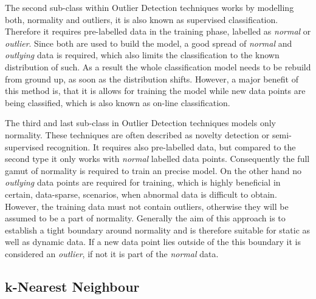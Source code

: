 The second sub-class within Outlier Detection techniques works by modelling both, normality and outliers, it is also known as supervised classification.
Therefore it requires pre-labelled data in the training phase, labelled as \emph{normal} or \emph{outlier}. Since both are used to build the model, a good spread of \emph{normal} and \emph{outlying} data is required, which also limits the classification to the known distribution of such.
As a result the whole classification model needs to be rebuild from ground up, as soon as the distribution shifts.
However, a major benefit of this method is, that it is allows for training the model while new data points are being classified, which is also known as on-line classification. \parencite[cf.][]{Hodge2004}

The third and last sub-class in Outlier Detection techniques models only normality. These techniques are often described as novelty detection or semi-supervised recognition.
It requires also pre-labelled data, but compared to the second type it only works with \emph{normal} labelled data points. Consequently the full gamut of normality is required to train an precise model. On the other hand no \emph{outlying} data points are required for training, which is highly beneficial in certain, data-sparse, scenarios, when abnormal data is difficult to obtain.
However, the training data must not contain outliers, otherwise they will be assumed to be a part of normality.
Generally the aim of this approach is to establish a tight boundary around normality and is therefore suitable for static as well as dynamic data.
If a new data point lies outside of the this boundary it is considered an \emph{outlier}, if not it is part of the \emph{normal} data.

\subsection{k-Nearest Neighbour}
\label{sec:background:network:novelty:knn}

